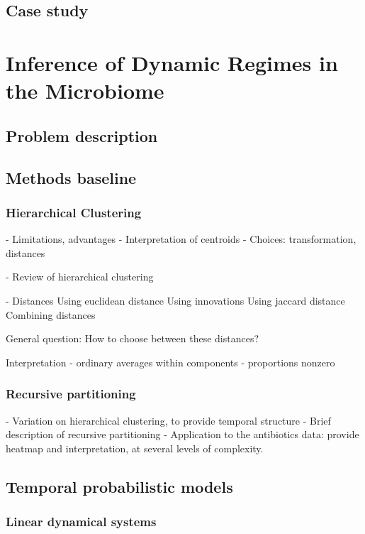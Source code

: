 \documentclass{report}
\begin{document}
\section{Case study}

\chapter{Inference of Dynamic Regimes in the Microbiome}

\section{Problem description}

\section{Methods baseline}

\subsection{Hierarchical Clustering}

- Limitations, advantages
- Interpretation of centroids
- Choices: transformation, distances

- Review of hierarchical clustering

- Distances
Using euclidean distance
Using innovations
Using jaccard distance
Combining distances

General question: How to choose between these distances?

Interpretation
- ordinary averages within components
- proportions nonzero

\subsection{Recursive partitioning}

- Variation on hierarchical clustering, to provide temporal structure
- Brief description of recursive partitioning
- Application to the antibiotics data: provide heatmap and interpretation, at
several levels of complexity.

\section{Temporal probabilistic models}

\subsection{Linear dynamical systems}
\end{document}
